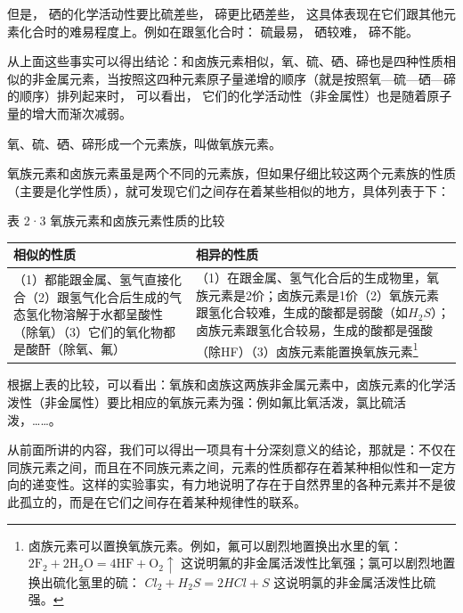 但是， 硒的化学活动性要比硫差些， 碲更比硒差些，
这具体表现在它们跟其他元素化合时的难易程度上。例如在跟氢化合时：
硫最易， 硒较难， 碲不能。

从上面这些事实可以得出结论：和卤族元素相似，氧、硫、硒、碲也是四种性质相似的非金属元素，当按照这四种元素原子量递增的顺序（就是按照氧---硫---硒---碲的顺序）排列起来时，
可以看出， 它们的化学活动性（非金属性）也是随着原子量的增大而渐次减弱。

氧、硫、硒、碲形成一个元素族，叫做氧族元素。

氧族元素和卤族元素虽是两个不同的元素族，但如果仔细比较这两个元素族的性质（主要是化学性质），就可发现它们之间存在着某些相似的地方，具体列表于下：

表 2·3 氧族元素和卤族元素性质的比较

{\def\LTcaptype{none} %
\begin{longtable}[]{@{}
  >{\raggedright\arraybackslash}p{}
  >{\raggedright\arraybackslash}p{}@{}}
\toprule\noalign{}
\begin{minipage}[b]{\linewidth}\raggedright
相似的性质
\end{minipage} & \begin{minipage}[b]{\linewidth}\raggedright
相异的性质
\end{minipage} \\
\midrule\noalign{}
\endhead
\bottomrule\noalign{}
\endlastfoot
（1）都能跟金属、氢气直接化合（2）跟氢气化合后生成的气态氢化物溶解于水都呈酸性（除氧）（3）它们的氧化物都是酸酐（除氧、氟）
&
（1）在跟金属、氢气化合后的生成物里，氧族元素是2价；卤族元素是1价（2）氧族元素跟氢化合较难，生成的酸都是弱酸（如\(H_2S\)）；卤族元素跟氢化合较易，生成的酸都是强酸（除HF）（3）卤族元素能置换氧族元素\footnote{卤族元素可以置换氧族元素。例如，氟可以剧烈地置换出水里的氧：
  \(2\mathrm{F}_{2} + 2\mathrm{H}_{2}\mathrm{O} = 4\mathrm{HF} + \mathrm{O}_{2}\uparrow\)
  这说明氟的非金属活泼性比氧强；氯可以剧烈地置换出硫化氢里的硫：
  \(Cl_{2}+H_{2}S=2HCl+S\) 这说明氯的非金属活泼性比硫强。} \\
\end{longtable}
}

根据上表的比较，可以看出：氧族和卤族这两族非金属元素中，卤族元素的化学活泼性（非金属性）要比相应的氧族元素为强：例如氟比氧活泼，氯比硫活泼，\ldots\ldots。

从前面所讲的内容，我们可以得出一项具有十分深刻意义的结论，那就是：不仅在同族元素之间，而且在不同族元素之间，元素的性质都存在着某种相似性和一定方向的递变性。这样的实验事实，有力地说明了存在于自然界里的各种元素并不是彼此孤立的，而是在它们之间存在着某种规律性的联系。

